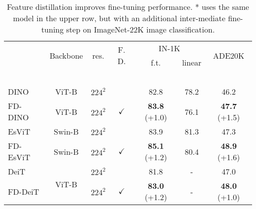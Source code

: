 \documentclass{article}
\begin{document}
\begin{table}[t]
\caption{Feature distillation improves fine-tuning performance. * uses the same model in the upper row, but with an additional inter-mediate fine-tuning step on ImageNet-22K image classification.}
\centering
  \begin{tabular}{l|c|c|c|cc|c}
\Xhline{1.0pt}
  \multirow{2}{*}{Method} & \multirow{2}{*}{Backbone} & \multirow{2}{*}{res.} & \multirow{2}{*}{F. D.} &  \multicolumn{2}{c|}{IN-1K} & \multirow{2}{*}{ADE20K}  \\
  \cline{5-6}
   &  &  &  & f.t. & linear   &   \\
  \hline
  \color{gray}{BEiT~\cite{bao2021beit}} & \color{gray}{ViT-B} & \color{gray}{$224^2$} & & \color{gray}{83.2} & \color{gray}{37.6} & \color{gray}{47.1} \\
  \color{gray}{MAE~\cite{MaskedAutoencoders2021}} & \color{gray}{ViT-B} & \color{gray}{$224^2$} & & \color{gray}{83.6} & \color{gray}{68.0} & \color{gray}{48.1} \\
  \color{gray}{SimMIM~\cite{xie2021simmim}} & \color{gray}{ViT-B} & \color{gray}{$224^2$} & & \color{gray}{83.8} & \color{gray}{56.7} & \color{gray}{47.6} \\
  \color{gray}{SimMIM~\cite{xie2021simmim}} & \color{gray}{Swin-B} & \color{gray}{$224^2$} & & \color{gray}{84.8} & \color{gray}{24.8} & \color{gray}{48.3} \\
   \hline
\color{gray}{WiSE-FT CLIP~\cite{ftclip2021}} & \color{gray}{ViT-L} & \color{gray}{336$^2$} & \color{gray}{} & \color{gray}{87.1} & \color{gray}{-} & \color{gray}{-}\\
  \hline
  \hline
  DINO~\cite{caron2021emerging} & ViT-B & $224^2$ & & 82.8 & 78.2 & 46.2 \\
  FD-DINO & ViT-B & $224^2$ & $\checkmark$ & \textbf{83.8}\scriptsize{ (+1.0)} & 76.1 &  \textbf{47.7}\scriptsize{ (+1.5)}\\
  \hline
  \hline
  EsViT~\cite{li2021esvit} & Swin-B & $224^2$ & & 83.9 & 81.3 & 47.3 \\
  FD-EsViT & Swin-B & $224^2$ & $\checkmark$ & \textbf{85.1}\scriptsize{ (+1.2)} & 80.4 & \textbf{48.9}\scriptsize{ (+1.6)}\\
  \hline
  \hline
  DeiT~\cite{touvron2020deit} & \multirow{2}{*}{ViT-B} & \multirow{1}{*}{$224^2$} & & 81.8 & - & 47.0 \\
  FD-DeiT &  & \multirow{1}{*}{$224^2$} & $\checkmark$ & \textbf{83.0}\scriptsize{ (+1.2)} & - & \textbf{48.0} \scriptsize{ (+1.0)} \\

\end{tabular}
\end{table}
\end{document}
